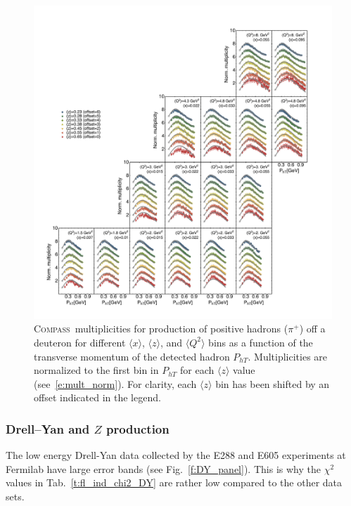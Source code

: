 \documentclass[aps,preprintnumbers,showpacs,nofootinbib,superscriptaddress,floatfix]{revtex4}
\newcommand{\compass}{\textsc{Compass}}
\begin{document}
\begin{figure}[h!]
\begin{center}
\includegraphics[width=\textwidth]{plots/COMPASS_SCIplot_flINDEP_Piplus.pdf}
\end{center}
\caption{\compass\ multiplicities for production of positive hadrons ($\pi^+$) off a deuteron for different $\langle x \rangle$, $\langle z \rangle$, and $\langle Q^2 \rangle$ bins as a function of the transverse momentum of the detected hadron $P_{hT}$. Multiplicities are normalized to the first bin in  $P_{hT}$ for each $\langle z \rangle$ value (see~\eqref{e:mult_norm}). For clarity, each $\langle z \rangle$  bin has been shifted by an offset indicated in the legend.} 
\label{f:C_pip}
\end{figure}





\subsubsection*{Drell--Yan and $Z$ production}
\label{sss:DYZ_agreement}


The low energy Drell-Yan data collected by the E288 and E605 experiments at Fermilab have large error bands (see Fig.~\ref{f:DY_panel}). This is why the $\chi^2$ values in Tab.~\ref{t:fl_ind_chi2_DY} are rather low compared to the other data sets. 
\end{document}
